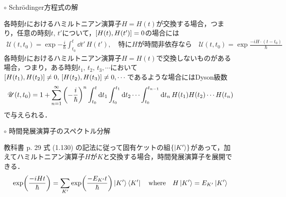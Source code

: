 \documentclass{jarticle}
\begin{document}
\begin{enumerate}
\begin{itemize}
  \item [$\circ$] Schrödinger方程式の解

    各時刻$t$におけるハミルトニアン演算子$H = H(t)$が交換する場合，つまり，任意の時刻$t, \, t'$について，$\qty[H(t), H(t')] = 0$の場合には
    \begin{gather}
      \mathscr{U}(t, t_0) = \exp{-\frac{i}{\hbar} \int_{t_0}^t \dd t' \, H(t')}, \quad
      特にHが時間非依存なら \quad \mathscr{U}(t, t_0) = \exp{\frac{-i H \cdot (t - t_0)}{\hbar}}
    \end{gather}
    各時刻$t$におけるハミルトニアン演算子$H = H(t)$で交換しないものがある場合，つまり，ある時刻$t_1, \, t_2, \, t_3 , \cdots$において$\qty[H(t_1), H(t_2)] \ne 0, \, \qty[H(t_2), H(t_3)] \ne 0, \cdots$であるような場合にはDyson級数
    \begin{align}
      \mathscr{U}(t, t_0) = 1 + \sum_{n = 1}^{\infty} \qty(-\frac{i}{\hbar})^n
      \int_{t_0}^t\dd t_1 \int_{t_0}^{t_1}\dd t_2 \cdots \int_{t_0}^{t_{n-1}}\dd t_n \, H(t_1) H(t_2) \cdots H(t_n)
    \end{align}
    で与えられる．

  \item [$\circ$] 時間発展演算子のスペクトル分解 %

    教科書 p. 29 式 (1.130) の記法に従って固有ケットの組$\qty{\ket{K'}}$があって，加えてハミルトニアン演算子$H$が$K$と交換する場合，時間発展演算子を展開できる．
    \begin{align}
      \exp(\frac{-i H t}{\hbar}) = \sum_{K'}\exp(\frac{-E_{K'}t}{\hbar})\ket{K'}\bra{K'} \quad
      \mathrm{where} \quad H\ket{K'} = E_{K'}\ket{K'}
    \end{align}

    

    

\end{itemize}
\end{enumerate}
\end{document}
